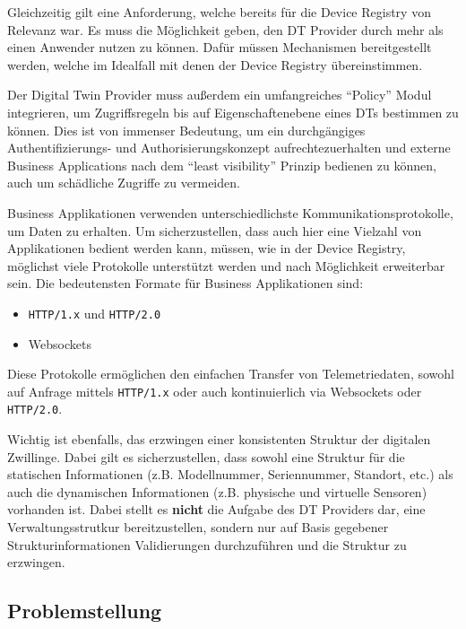 Gleichzeitig gilt eine Anforderung, welche bereits für die Device Registry von Relevanz war. Es muss die Möglichkeit geben, den \ac{DT} Provider durch mehr als einen Anwender nutzen zu können. Dafür müssen Mechanismen bereitgestellt werden, welche im Idealfall mit denen der Device Registry übereinstimmen.

Der Digital Twin Provider muss außerdem ein umfangreiches \enquote{Policy} Modul integrieren, um Zugriffsregeln bis auf Eigenschaftenebene eines \ac{DT}s bestimmen zu können. Dies ist von immenser Bedeutung, um ein durchgängiges Authentifizierungs- und Authorisierungskonzept aufrechtezuerhalten und externe Business Applications nach dem \enquote{least visibility} Prinzip bedienen zu können, auch um schädliche Zugriffe zu vermeiden.

Business Applikationen verwenden unterschiedlichste Kommunikationsprotokolle, um Daten zu erhalten. Um sicherzustellen, dass auch hier eine Vielzahl von Applikationen bedient werden kann, müssen, wie in der Device Registry, möglichst viele Protokolle unterstützt werden und nach Möglichkeit erweiterbar sein. Die bedeutensten Formate für Business Applikationen sind:

\begin{itemize}
    \item \texttt{HTTP/1.x} und \texttt{HTTP/2.0}
    \item Websockets
\end{itemize}

Diese Protokolle ermöglichen den einfachen Transfer von Telemetriedaten, sowohl auf Anfrage mittels \texttt{HTTP/1.x} oder auch kontinuierlich via Websockets oder \texttt{HTTP/2.0}.

Wichtig ist ebenfalls, das erzwingen einer konsistenten Struktur der digitalen Zwillinge. Dabei gilt es sicherzustellen, dass sowohl eine Struktur für die statischen Informationen (z.B. Modellnummer, Seriennummer, Standort, etc.) als auch die dynamischen Informationen (z.B. physische und virtuelle Sensoren) vorhanden ist. Dabei stellt es \textbf{nicht} die Aufgabe des \ac{DT} Providers dar, eine Verwaltungsstrutkur bereitzustellen, sondern nur auf Basis gegebener Strukturinformationen Validierungen durchzuführen und die Struktur zu erzwingen.

\subsection{Problemstellung}

